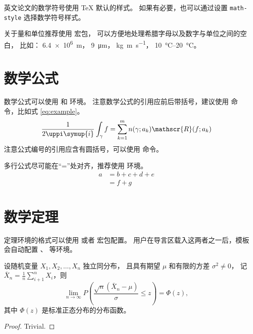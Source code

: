 英文论文的数学符号使用 \TeX{} 默认的样式。
如果有必要，也可以通过设置 \verb|math-style| 选择数学符号样式。

关于量和单位推荐使用
\href{http://mirrors.ctan.org/macros/latex/contrib/siunitx/siunitx.pdf}{}
宏包，
可以方便地处理希腊字母以及数字与单位之间的空白，
比如：
\SI{6.4e6}{m}，
\SI{9}{\micro\meter}，
\si{kg.m.s^{-1}}，
\SIrange{10}{20}{\degreeCelsius}。



\section{数学公式}

数学公式可以使用  和  环境。
注意数学公式的引用应前后带括号，建议使用  命令，比如式 \eqref{eq:example}。
\begin{equation}
  \frac{1}{2 \uppi \symup{i}} \int_\gamma f = \sum_{k=1}^m n(\gamma; a_k) \mathscr{R}(f; a_k)
  \label{eq:example}
\end{equation}
注意公式编号的引用应含有圆括号，可以使用  命令。

多行公式尽可能在“=”处对齐，推荐使用  环境。
\begin{align}
  a & = b + c + d + e \\
    & = f + g
\end{align}



\section{数学定理}

定理环境的格式可以使用  或者  宏包配置。
用户在导言区载入这两者之一后，模板会自动配置 、 等环境。

\begin{theorem}
  设随机变量 $X_1, X_2, \dots, X_n$ 独立同分布， 且具有期望 $\mu$ 和有限的方差 $\sigma^2 \ne 0$，
  记 $\bar{X}_n = \frac{1}{n} \sum_{i+1}^n X_i$，则
  \begin{equation}
    \lim_{n \to \infty} P \left(\frac{\sqrt{n} \left( \bar{X}_n - \mu \right)}{\sigma} \le z \right) = \Phi(z),
  \end{equation}
  其中 $\Phi(z)$ 是标准正态分布的分布函数。
\end{theorem}
\begin{proof}
  Trivial.
\end{proof}

